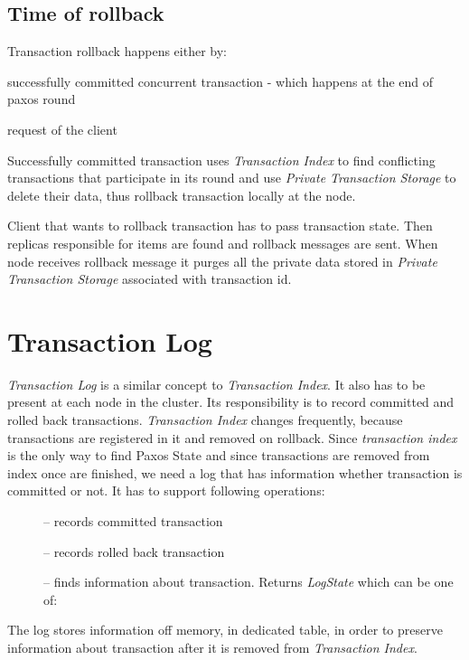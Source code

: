 \subsection{Time of rollback}
Transaction rollback happens either by:
\begin{enumerate*}
\item successfully committed concurrent transaction - which happens at the end of paxos round
\item request of the client
\end{enumerate*}

Successfully committed transaction uses \emph{Transaction Index} to find conflicting transactions that participate in its round and use \emph{Private Transaction Storage} to delete their data, thus rollback transaction locally at the node.

Client that wants to rollback transaction has to pass transaction state. Then replicas responsible for items are found and rollback messages are sent. When node receives rollback message it purges all the private data stored in \emph{Private Transaction Storage} associated with transaction id.

\section{Transaction Log}
\emph{Transaction Log} is a similar concept to \emph{Transaction Index}. It also has to be present at each node in the cluster. Its responsibility is to record committed and rolled back transactions. \emph{Transaction Index} changes frequently, because transactions are registered in it and removed on rollback. Since \emph{transaction index} is the only way to find Paxos State and since transactions are removed from index once are finished, we need a log that has information whether transaction is committed or not. It has to support following operations:
\begin{description}
\item[] -- records committed transaction
\item[] -- records rolled back transaction
\item[] -- finds information about transaction. Returns \emph{LogState} which can be one of:  
\end{description}
The log stores information off memory, in dedicated table, in order to preserve information about transaction after it is removed from \emph{Transaction Index}.


